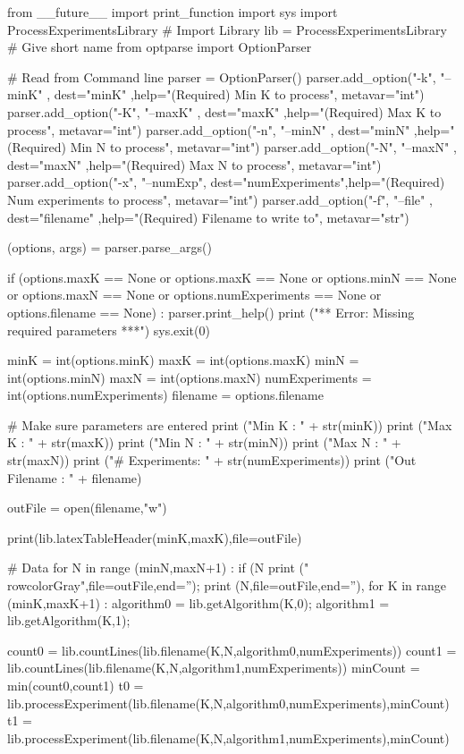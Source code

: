 from __future__ import print_function
import sys
import ProcessExperimentsLibrary  # Import Library
lib = ProcessExperimentsLibrary   # Give short name
from optparse import OptionParser


    
# Read from Command line
parser = OptionParser()
parser.add_option("-k", "--minK"  , dest="minK"          ,help="(Required) Min K to process", metavar="int")
parser.add_option("-K", "--maxK"  , dest="maxK"          ,help="(Required) Max K to process", metavar="int")
parser.add_option("-n", "--minN"  , dest="minN"          ,help="(Required) Min N to process", metavar="int")
parser.add_option("-N", "--maxN"  , dest="maxN"          ,help="(Required) Max N to process", metavar="int")
parser.add_option("-x", "--numExp", dest="numExperiments",help="(Required) Num experiments to process", metavar="int")
parser.add_option("-f", "--file"  , dest="filename"      ,help="(Required) Filename to write to", metavar="str")

(options, args) = parser.parse_args()

if (options.maxK == None or options.maxK == None or options.minN == None or options.maxN == None or 
    options.numExperiments == None or options.filename == None) :    
    parser.print_help()
    print ("\n *** Error: Missing required parameters ***\n")
    sys.exit(0)

minK           = int(options.minK)
maxK           = int(options.maxK)
minN           = int(options.minN)
maxN           = int(options.maxN)
numExperiments = int(options.numExperiments)
filename       = options.filename

# Make sure parameters are entered
print ("Min K        : " + str(minK))
print ("Max K        : " + str(maxK))
print ("Min N        : " + str(minN))
print ("Max N        : " + str(maxN))
print ("# Experiments: " + str(numExperiments))
print ("Out Filename : " + filename)

outFile = open(filename,"w")



print(lib.latexTableHeader(minK,maxK),file=outFile)

# Data
for N in range (minN,maxN+1) :
    if (N %
        print ("\\rowcolor{Gray}",file=outFile,end='');
    print (N,file=outFile,end=''),
    for K in range (minK,maxK+1) :
        algorithm0 = lib.getAlgorithm(K,0);
        algorithm1 = lib.getAlgorithm(K,1);

        count0 = lib.countLines(lib.filename(K,N,algorithm0,numExperiments))
        count1 = lib.countLines(lib.filename(K,N,algorithm1,numExperiments))
        minCount = min(count0,count1)
        t0 = lib.processExperiment(lib.filename(K,N,algorithm0,numExperiments),minCount)
        t1 = lib.processExperiment(lib.filename(K,N,algorithm1,numExperiments),minCount)
        
